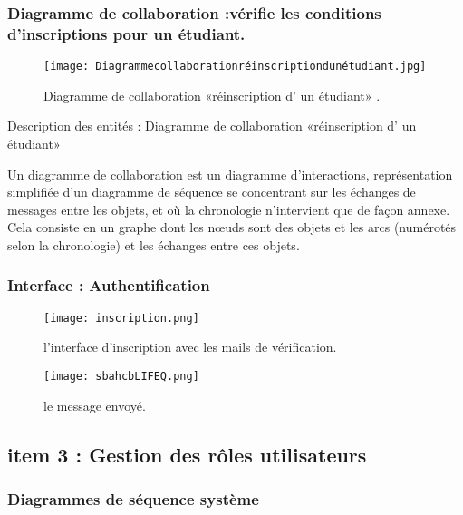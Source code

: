 \subsubsection{Diagramme de collaboration :vérifie les conditions d’inscriptions pour un étudiant.}
\begin{figure}[ht]
	\centering
	\texttt{[image: Diagrammecollaborationréinscriptiondunétudiant.jpg]}
	\caption{Diagramme de collaboration «réinscription d' un étudiant» .}
	\label{fig:Diagramme de collaboration réinscription d' un étudiant  }
\end{figure}
\FloatBarrier
{\Large \color{cyan} Description des entités : Diagramme de collaboration «réinscription d' un étudiant»}

Un diagramme de collaboration est un diagramme d'interactions, représentation simplifiée d'un diagramme de séquence se concentrant sur les échanges de messages entre les objets, et où la chronologie n'intervient que de façon annexe.\\
Cela consiste en un graphe dont les nœuds sont des objets et les arcs (numérotés selon la chronologie) et les échanges entre ces objets.


\clearpage

\subsubsection{ Interface : Authentification  }


\begin{figure}[ht]
	\centering
	\texttt{[image: inscription.png]}
	\caption{l'interface d'inscription avec les mails de vérification.}
	\label{fig:l'interface d'inscription avec les mails de vérification }
\end{figure}


\begin{figure}[ht]
	\centering
	\texttt{[image: sbahcbLIFEQ.png]}
	\caption{le message envoyé.}
	\label{fig:le message envoyé }
\end{figure}
\clearpage
\subsection{item 3 : Gestion des rôles utilisateurs}
\subsubsection{Diagrammes de séquence système }

